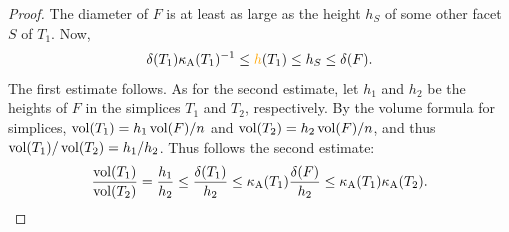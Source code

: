 \documentclass[10pt,letterpaper]{article}
\begin{document}
\begin{proof}
    The diameter of $F$ is at least as large as the height $h_S$ of some other facet $S$ of $T_{1}$. 
    Now, 
    \begin{align*}
        \diam(T_{1}) \aspectratio(T_{1})^{-1} \leq \height(T_{1}) \leq h_S \leq \diam(F).
    \end{align*}
    The first estimate follows. 
    As for the second estimate,
    let $h_1$ and $h_2$ be the heights of $F$ in the simplices $T_1$ and $T_2$, respectively. 
    By the volume formula for simplices, $\operatorname{vol}(T_1) = h_1 \operatorname{vol}(F)/n$ and $\operatorname{vol}(T_2) = h_2 \operatorname{vol}(F)/n$, and thus $\operatorname{vol}(T_1)/\operatorname{vol}(T_2) = h_1/h_2$. Thus follows the second estimate: 
    \begin{align*}
        \frac{ \operatorname{vol}(T_1) }{ \operatorname{vol}(T_2) }
        = 
        \frac{ h_1 }{ h_2 }
        \leq
        \frac{ {\delta}(T_1) }{ h_2 }
        \leq
        \kappa_{\rm A}(T_{1}) \frac{ {\delta}(F) }{ h_2 }
        \leq
        \kappa_{\rm A}(T_{1}) \kappa_{\rm A}(T_{2})
        .
    \end{align*}

\end{proof}
\end{document}
